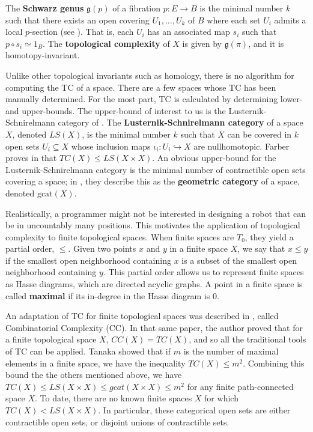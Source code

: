 \documentclass[11pt]{article}
\begin{document}
The {\bf Schwarz genus} $\mathfrak{g}(p)$ of a fibration $p:E \to B$ is the minimal number $k$ such that there exists an open covering $U_1,\hdots,U_k$ of $B$ where each set $U_i$ admits a local $p$-section (see \cite{Schwarz1958}).
That is, each $U_i$ has an associated map $s_i$ such that $p \circ s_i \simeq 1_B$. The \textbf{topological complexity} of $X$ is given by $\mathfrak{g}(\pi)$, and it is homotopy-invariant.

Unlike other topological invariants such as homology, there is no algorithm for computing the TC of a space.
There are a few spaces whose TC has been manually determined.
For the most part, TC is calculated by determining lower- and upper-bounds.
The upper-bound of interest to us is the Lusternik-Schnirelmann category of \cite{LS34}.
The \textbf{Lusternik-Schnirelmann category} of a space $X$, denoted ${LS}(X)$, is the minimal number $k$ such that $X$ can be covered in $k$ open sets $U_i \subseteq X$ whose inclusion maps $\iota_i: U_i \hookrightarrow X$ are nullhomotopic.
Farber proves in \cite{Farber2001} that $TC(X) \leq LS(X\times X)$.
An obvious upper-bound for the Lusternik-Schnirelmann category is the minimal number of contractible open sets covering a space; in \cite{Fernandez-Ternero2018}, they describe this as the \textbf{geometric category} of a space, denoted $\text{gcat}(X)$.

Realistically, a programmer might not be interested in designing a robot that can be in uncountably many positions.
This motivates the application of topological complexity to finite topological spaces.
When finite spaces are $T_0$, they yield a partial order, $\leq$. Given two points $x$ and $y$ in a finite space $X$, we say that $x \leq y$ if the smallest open neighborhood containing $x$ is a subset of the smallest open neighborhood containing $y$. This partial order allows us to represent finite spaces as Hasse diagrams, which are directed acyclic graphs. A point in a finite space is called \textbf{maximal} if its in-degree in the Hasse diagram is 0.

An adaptation of TC for finite topological spaces was described in \cite{Tanaka2018}, called Combinatorial Complexity (CC).
In that same paper, the author proved that for a finite topological space $X$, $CC(X) = TC(X)$, and so all the traditional tools of TC can be applied.
Tanaka showed that if $m$ is the number of maximal elements in a finite space, we have the inequality $TC(X) \leq m^2$.
Combining this bound the the others mentioned above, we have $TC(X) \leq LS(X\times X) \leq gcat(X \times X) \leq m^2$ for any finite path-connected space $X$.
To date, there are no known finite spaces $X$ for which $TC(X) < LS(X \times X)$.
In particular, these categorical open sets are either contractible open sets, or disjoint unions of contractible sets.
\end{document}
